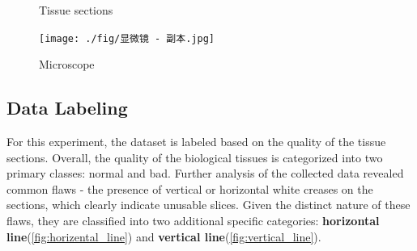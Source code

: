 \begin{figure}[H]
\begin{minipage}{0.3\textwidth}
        \caption{Tissue sections}
        \label{fig:采集样本}
    \end{minipage}
    \begin{minipage}{0.35\textwidth}
        \centering
        \texttt{[image: ./fig/显微镜 - 副本.jpg]}
        \caption{Microscope}
        \label{fig:显微镜}
    \end{minipage}
\end{figure}





\subsection{Data Labeling}

For this experiment, the dataset is labeled based on the quality of the tissue sections. Overall, the quality of the biological tissues is categorized into two primary classes: normal and bad. Further analysis of the collected data revealed common flaws - the presence of vertical or horizontal white creases on the sections, which clearly indicate unusable slices. Given the distinct nature of these flaws, they are classified into two additional specific categories: \textbf{horizontal line}(\autoref{fig:horizental_line}) and \textbf{vertical line}(\autoref{fig:vertical_line}).

